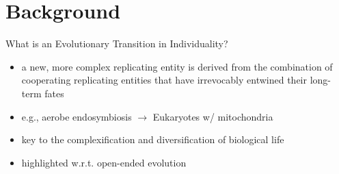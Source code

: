 \section{Background}

\begin{frame}{What is an Evolutionary Transition in Individuality?}

\begin{itemize}[<+->]
\item a new, more complex replicating entity is derived from the combination of cooperating replicating entities that have irrevocably entwined their long-term fates \cite{west2015major}
\item e.g., aerobe endosymbiosis $\rightarrow$ Eukaryotes w/ mitochondria \cite{sagan1967origin}
\item key to the complexification and diversification of biological life \cite{smith1997major}
\item highlighted w.r.t. open-ended evolution \cite{ray1996evolving, banzhaf2016defining}
\end{itemize}

\end{frame}

